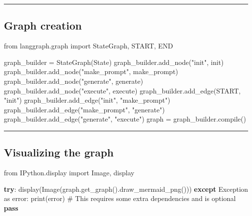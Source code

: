 \documentclass[
  letterpaper,
  DIV=11,
  numbers=noendperiod]{scrartcl}
\newenvironment{Shaded}{\begin{snugshade}}{\end{snugshade}}
\newcommand{\BuiltInTok}[1]{\textcolor[rgb]{0.00,0.23,0.31}{#1}}
\newcommand{\CommentTok}[1]{\textcolor[rgb]{0.37,0.37,0.37}{#1}}
\newcommand{\ControlFlowTok}[1]{\textcolor[rgb]{0.00,0.23,0.31}{\textbf{#1}}}
\newcommand{\ImportTok}[1]{\textcolor[rgb]{0.00,0.46,0.62}{#1}}
\newcommand{\NormalTok}[1]{\textcolor[rgb]{0.00,0.23,0.31}{#1}}
\newcommand{\OperatorTok}[1]{\textcolor[rgb]{0.37,0.37,0.37}{#1}}
\newcommand{\PreprocessorTok}[1]{\textcolor[rgb]{0.68,0.00,0.00}{#1}}
\newcommand{\StringTok}[1]{\textcolor[rgb]{0.13,0.47,0.30}{#1}}
\begin{document}
\begin{center}\rule{0.5\linewidth}{0.5pt}\end{center}

\subsection{Graph creation}\label{graph-creation}

\begin{Shaded}
\begin{Highlighting}[numbers=left,,]
\ImportTok{from}\NormalTok{ langgraph.graph }\ImportTok{import}\NormalTok{ StateGraph, START, END}

\NormalTok{graph\_builder }\OperatorTok{=}\NormalTok{ StateGraph(State)}
\NormalTok{graph\_builder.add\_node(}\StringTok{"init"}\NormalTok{, init)}
\NormalTok{graph\_builder.add\_node(}\StringTok{"make\_prompt"}\NormalTok{, make\_prompt)}
\NormalTok{graph\_builder.add\_node(}\StringTok{"generate"}\NormalTok{, generate)}
\NormalTok{graph\_builder.add\_node(}\StringTok{"execute"}\NormalTok{, execute)}
\NormalTok{graph\_builder.add\_edge(START, }\StringTok{"init"}\NormalTok{)}
\NormalTok{graph\_builder.add\_edge(}\StringTok{"init"}\NormalTok{, }\StringTok{"make\_prompt"}\NormalTok{)}
\NormalTok{graph\_builder.add\_edge(}\StringTok{"make\_prompt"}\NormalTok{, }\StringTok{"generate"}\NormalTok{)}
\NormalTok{graph\_builder.add\_edge(}\StringTok{"generate"}\NormalTok{, }\StringTok{"execute"}\NormalTok{)}
\NormalTok{graph }\OperatorTok{=}\NormalTok{ graph\_builder.}\BuiltInTok{compile}\NormalTok{()}
\end{Highlighting}
\end{Shaded}

\begin{center}\rule{0.5\linewidth}{0.5pt}\end{center}

\subsection{\texorpdfstring{Visualizing the graph
}{Visualizing the graph }}\label{visualizing-the-graph}

\begin{Shaded}
\begin{Highlighting}[]
\ImportTok{from}\NormalTok{ IPython.display }\ImportTok{import}\NormalTok{ Image, display}

\ControlFlowTok{try}\NormalTok{:}
\NormalTok{    display(Image(graph.get\_graph().draw\_mermaid\_png()))}
\ControlFlowTok{except} \PreprocessorTok{Exception} \ImportTok{as}\NormalTok{ error:}
    \BuiltInTok{print}\NormalTok{(error)}
    \CommentTok{\# This requires some extra dependencies and is optional}
    \ControlFlowTok{pass}
\end{Highlighting}
\end{Shaded}
\end{document}
